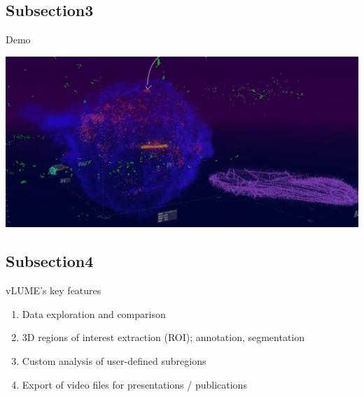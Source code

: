\documentclass[10pt, xcolor=x11names,compress]{beamer}
\begin{document}
\subsection{Subsection3}
\begin{frame}{Demo}
	\begin{center}
		\href{https://www.youtube.com/watch?v=6yx_sayhsiA&feature=youtu.be}{
		\includegraphics[scale=0.25]
		{images/demo.png}
	}
	\end{center}
\end{frame}

\subsection{Subsection4}
\begin{frame}{vLUME's key features}
	\begin{enumerate}
		\item Data exploration and comparison
		\item 3D regions of interest extraction (ROI); annotation, segmentation
		\item Custom analysis of user-defined subregions
		\item Export of video files for presentations / publications
	\end{enumerate}
\end{frame}
\end{document}
